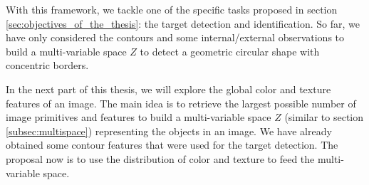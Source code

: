 With this framework, we tackle one of the specific tasks proposed in section \ref{sec:objectives_of_the_thesis}: the target detection and identification. So far, we have only considered the contours and some internal/external observations to build a multi-variable space $Z$ to detect a geometric circular shape with concentric borders.

In the next part of this thesis, we will explore the global color and texture features of an image. The main idea is to retrieve the largest possible number of image primitives and features to build a multi-variable space $Z$ (similar to section \ref{subsec:multispace}) representing the objects in an image. We have already obtained some contour features that were used for the target detection. The proposal now is to use the distribution of color and texture to feed the multi-variable space.


